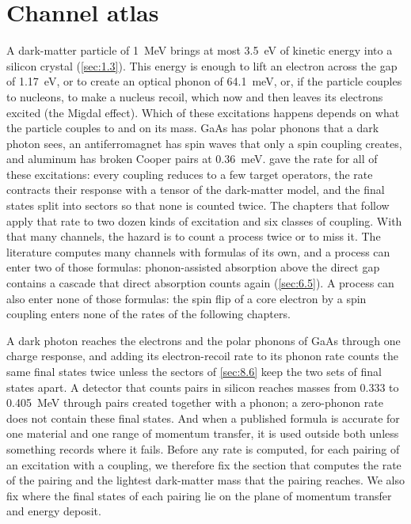 \chapter{Channel atlas}\label{chap:9}
A dark-matter particle of \SI{1}{MeV} brings at most \SI{3.5}{eV} of kinetic energy into a silicon crystal (\cref{sec:1.3}). This energy is enough to lift an electron across the gap of \SI{1.17}{eV}, or to create an optical phonon of \SI{64.1}{meV}, or, if the particle couples to nucleons, to make a nucleus recoil, which now and then leaves its electrons excited (the Migdal effect). Which of these excitations happens depends on what the particle couples to and on its mass. GaAs has polar phonons that a dark photon sees, an antiferromagnet has spin waves that only a spin coupling creates, and aluminum has broken Cooper pairs at \SI{0.36}{meV}.  gave the rate for all of these excitations: every coupling reduces to a few target operators, the rate contracts their response with a tensor of the dark-matter model, and the final states split into sectors so that none is counted twice. The chapters that follow apply that rate to two dozen kinds of excitation and six classes of coupling. With that many channels, the hazard is to count a process twice or to miss it. The literature computes many channels with formulas of its own, and a process can enter two of those formulas: phonon-assisted absorption above the direct gap contains a cascade that direct absorption counts again (\cref{sec:6.5}). A process can also enter none of those formulas: the spin flip of a core electron by a spin coupling enters none of the rates of the following chapters.

A dark photon reaches the electrons and the polar phonons of GaAs through one charge response, and adding its electron-recoil rate to its phonon rate counts the same final states twice unless the sectors of \cref{sec:8.6} keep the two sets of final states apart. A detector that counts pairs in silicon reaches masses from 0.333 to \SI{0.405}{MeV} through pairs created together with a phonon; a zero-phonon rate does not contain these final states. And when a published formula is accurate for one material and one range of momentum transfer, it is used outside both unless something records where it fails. Before any rate is computed, for each pairing of an excitation with a coupling, we therefore fix the section that computes the rate of the pairing and the lightest dark-matter mass that the pairing reaches. We also fix where the final states of each pairing lie on the plane of momentum transfer and energy deposit.






\printbibliography[heading=subbibliography]
